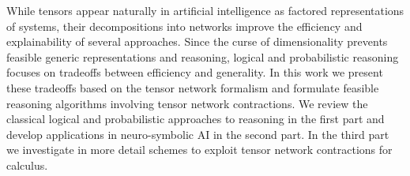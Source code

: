 While tensors appear naturally in artificial intelligence as factored representations of systems, their decompositions into networks improve the efficiency and explainability of several approaches.
Since the curse of dimensionality prevents feasible generic representations and reasoning, logical and probabilistic reasoning focuses on tradeoffs between efficiency and generality.
In this work we present these tradeoffs based on the tensor network formalism and formulate feasible reasoning algorithms involving tensor network contractions.
We review the classical logical and probabilistic approaches to reasoning in the first part and develop applications in neuro-symbolic AI in the second part.
In the third part we investigate in more detail schemes to exploit tensor network contractions for calculus.